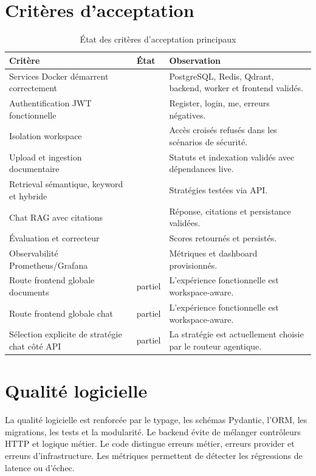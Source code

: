 \documentclass[12pt,a4paper,oneside]{report}
\newcommand{\cmark}{\ding{51}}
\begin{document}
\section{Critères d'acceptation}
\begin{table}[H]
  \centering
  \caption{État des critères d'acceptation principaux}
  \begin{tabularx}{\textwidth}{L{5cm}L{2cm}Y}
    \toprule
    \textbf{Critère} & \textbf{État} & \textbf{Observation} \\
    \midrule
    Services Docker démarrent correctement & \cmark & PostgreSQL, Redis, Qdrant, backend, worker et frontend validés. \\
    Authentification JWT fonctionnelle & \cmark & Register, login, me, erreurs négatives. \\
    Isolation workspace & \cmark & Accès croisés refusés dans les scénarios de sécurité. \\
    Upload et ingestion documentaire & \cmark & Statuts et indexation validés avec dépendances live. \\
    Retrieval sémantique, keyword et hybride & \cmark & Stratégies testées via API. \\
    Chat RAG avec citations & \cmark & Réponse, citations et persistance validées. \\
    Évaluation et correcteur & \cmark & Scores retournés et persistés. \\
    Observabilité Prometheus/Grafana & \cmark & Métriques et dashboard provisionnés. \\
    Route frontend globale documents & partiel & L'expérience fonctionnelle est workspace-aware. \\
    Route frontend globale chat & partiel & L'expérience fonctionnelle est workspace-aware. \\
    Sélection explicite de stratégie chat côté API & partiel & La stratégie est actuellement choisie par le routeur agentique. \\
    \bottomrule
  \end{tabularx}
\end{table}

\section{Qualité logicielle}
La qualité logicielle est renforcée par le typage, les schémas Pydantic, l'ORM, les migrations, les tests et la modularité. Le backend évite de mélanger contrôleurs HTTP et logique métier. Le code distingue erreurs métier, erreurs provider et erreurs d'infrastructure. Les métriques permettent de détecter les régressions de latence ou d'échec.
\end{document}
